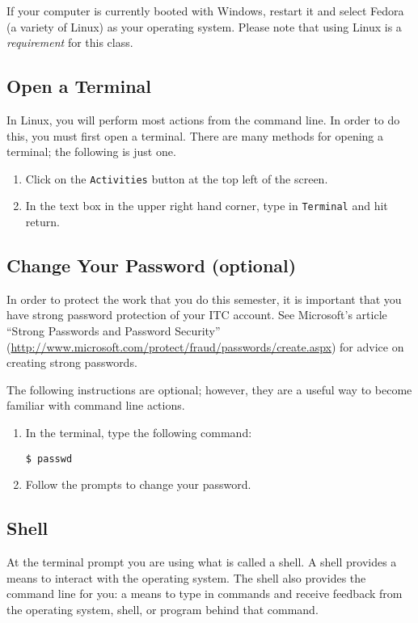 \documentclass[11pt]{cselabheader}
\begin{document}
If your computer is currently booted with Windows, restart it and select Fedora
(a variety of Linux) as your operating system. Please note that using Linux is a
\emph{requirement} for this class.

\subsection{Open a Terminal}
In Linux, you will perform most actions from the command line. In order to do
this, you must first open a terminal. There are many methods for opening a
terminal; the following is just one.

\begin{enumerate}
  \item Click on the \texttt{Activities} button at the top left of the screen.
  \item In the text box in the upper right hand corner, type in
    \texttt{Terminal} and hit return.
\end{enumerate}

\subsection{Change Your Password (optional)}
In order to protect the work that you do this semester, it is important that you
have strong password protection of your ITC account.  See Microsoft's article
``Strong Passwords and Password Security''
(\url{http://www.microsoft.com/protect/fraud/passwords/create.aspx}) for advice
on creating strong passwords.

The following instructions are optional; however, they are a useful way to
become familiar with command line actions.

\begin{enumerate}
  \item In the terminal, type the following command:
    \begin{lstlisting}[style=bash]
$ passwd
    \end{lstlisting}
  \item Follow the prompts to change your password.
\end{enumerate}

\subsection{Shell}
At the terminal prompt you are using what is called a shell. A shell
provides a means to interact with the operating system. The shell also provides
the command line for you: a means to type in commands and receive feedback from
the operating system, shell, or program behind that command.
\end{document}
